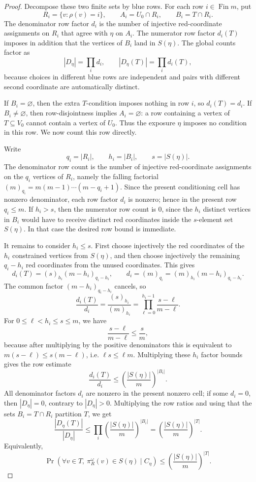 \begin{proof}
Decompose these two finite sets by blue rows.  For each row
\(i\in\operatorname{Fin}m\), put
\[
R_i=\{v:\rho(v)=i\},\qquad A_i=U_0\cap R_i,\qquad
B_i=T\cap R_i.
\]
The denominator row factor \(d_i\) is the number of injective red-coordinate
assignments on \(R_i\) that agree with \(\eta\) on \(A_i\).  The numerator
row factor \(d_i(T)\) imposes in addition that the vertices of \(B_i\) land
in \(S(\eta)\).  The global counts factor as
\[
|D_\eta|=\prod_i d_i,\qquad |D_\eta(T)|=\prod_i d_i(T),
\]
because choices in different blue rows are independent and pairs with
different second coordinate are automatically distinct.

If \(B_i=\varnothing\), then the extra \(T\)-condition imposes nothing in row
\(i\), so \(d_i(T)=d_i\).  If \(B_i\ne\varnothing\), then row-disjointness
implies \(A_i=\varnothing\): a row containing a vertex of \(T\subseteq V_0\)
cannot contain a vertex of \(U_0\).  Thus the exposure \(\eta\) imposes no
condition in this row.  We now count this row directly.

Write
\[
q_i=|R_i|,\qquad h_i=|B_i|,\qquad s=|S(\eta)|.
\]
The denominator row count is the number of injective red-coordinate
assignments on the \(q_i\) vertices of \(R_i\), namely the falling factorial
\((m)_{q_i}=m(m-1)\cdots(m-q_i+1)\).  Since the present conditioning cell has
nonzero denominator, each row factor \(d_i\) is nonzero; hence in the present
row \(q_i\le m\).  If \(h_i>s\), then the numerator row count is \(0\), since
the \(h_i\) distinct vertices in \(B_i\) would have to receive distinct
red coordinates inside the \(s\)-element set \(S(\eta)\).  In that case the
desired row bound is immediate.

It remains to consider \(h_i\le s\).  First choose injectively the
red coordinates of the \(h_i\) constrained vertices from \(S(\eta)\), and
then choose injectively the remaining \(q_i-h_i\) red coordinates from the
unused coordinates.  This gives
\[
d_i(T)=(s)_{h_i}(m-h_i)_{q_i-h_i},
\qquad
d_i=(m)_{q_i}=(m)_{h_i}(m-h_i)_{q_i-h_i}.
\]
The common factor \((m-h_i)_{q_i-h_i}\) cancels, so
\[
\frac{d_i(T)}{d_i}
=\frac{(s)_{h_i}}{(m)_{h_i}}
=\prod_{\ell=0}^{h_i-1}\frac{s-\ell}{m-\ell}.
\]
For \(0\le\ell<h_i\le s\le m\), we have
\[
\frac{s-\ell}{m-\ell}\le \frac{s}{m},
\]
because after multiplying by the positive denominators this is equivalent
to \(m(s-\ell)\le s(m-\ell)\), i.e. \(\ell s\le \ell m\).  Multiplying these
\(h_i\) factor bounds gives the row estimate
\[
\frac{d_i(T)}{d_i}\le
\left(\frac{|S(\eta)|}{m}\right)^{|B_i|}.
\]
All denominator factors \(d_i\) are nonzero in the present nonzero cell; if
some \(d_i=0\), then \(|D_\eta|=0\), contrary to \(|D_\eta|>0\).
Multiplying the row ratios and using that the sets \(B_i=T\cap R_i\)
partition \(T\), we get
\[
\frac{|D_\eta(T)|}{|D_\eta|}
\le
\prod_i\left(\frac{|S(\eta)|}{m}\right)^{|B_i|}
=
\left(\frac{|S(\eta)|}{m}\right)^{|T|}.
\]
Equivalently,
\[
\Pr(\forall v\in T,\ \pi_R^\omega(v)\in S(\eta)\mid C_\eta)
\le \left(\frac{|S(\eta)|}{m}\right)^{|T|}.
\]


\end{proof}
